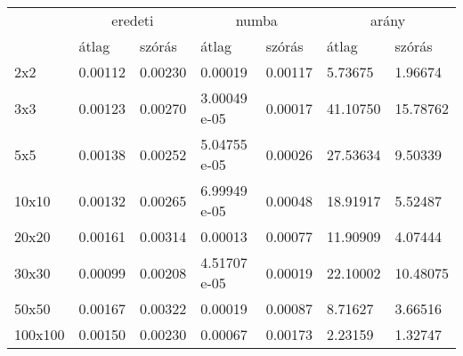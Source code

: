 \documentclass{article}
\theoremstyle{definition}
\theoremstyle{theorem}
\begin{document}
\begin{center}
\begin{tabular}{l|ll|ll|ll|}
\cline{2-7}
                              & \multicolumn{2}{c|}{eredeti}           & \multicolumn{2}{c|}{numba}             & \multicolumn{2}{c|}{arány}              \\ \cline{2-7}
                              & \multicolumn{1}{l|}{átlag}   & szórás  & \multicolumn{1}{l|}{átlag}   & szórás  & \multicolumn{1}{l|}{átlag}    & szórás  \\ \hline
\multicolumn{1}{|l|}{2x2}     & \multicolumn{1}{l|}{0.00112} & 0.00230 & \multicolumn{1}{l|}{0.00019} & 0.00117 & \multicolumn{1}{l|}{5.73675}  & 1.96674 \\ \hline
\multicolumn{1}{|l|}{3x3}   & \multicolumn{1}{l|}{0.00123} & 0.00270 & \multicolumn{1}{l|}{3.00049 e-05} & 0.00017 & \multicolumn{1}{l|}{41.10750} & 15.78762 \\ \hline
\multicolumn{1}{|l|}{5x5}   & \multicolumn{1}{l|}{0.00138} & 0.00252 & \multicolumn{1}{l|}{5.04755 e-05} & 0.00026 & \multicolumn{1}{l|}{27.53634} & 9.50339  \\ \hline
\multicolumn{1}{|l|}{10x10} & \multicolumn{1}{l|}{0.00132} & 0.00265 & \multicolumn{1}{l|}{6.99949 e-05} & 0.00048 & \multicolumn{1}{l|}{18.91917} & 5.52487  \\ \hline
\multicolumn{1}{|l|}{20x20}   & \multicolumn{1}{l|}{0.00161} & 0.00314 & \multicolumn{1}{l|}{0.00013} & 0.00077 & \multicolumn{1}{l|}{11.90909} & 4.07444 \\ \hline
\multicolumn{1}{|l|}{30x30} & \multicolumn{1}{l|}{0.00099} & 0.00208 & \multicolumn{1}{l|}{4.51707 e-05} & 0.00019 & \multicolumn{1}{l|}{22.10002} & 10.48075 \\ \hline
\multicolumn{1}{|l|}{50x50}   & \multicolumn{1}{l|}{0.00167} & 0.00322 & \multicolumn{1}{l|}{0.00019} & 0.00087 & \multicolumn{1}{l|}{8.71627}  & 3.66516 \\ \hline
\multicolumn{1}{|l|}{100x100} & \multicolumn{1}{l|}{0.00150} & 0.00230 & \multicolumn{1}{l|}{0.00067} & 0.00173 & \multicolumn{1}{l|}{2.23159}  & 1.32747 \\ \hline
\end{tabular}
\end{center}
\subsection{}
\end{document}
